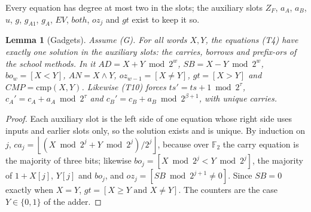 \documentclass[11pt,letterpaper]{article}
\newtheorem{lemma}[theorem]{Lemma}
\theoremstyle{definition}
\theoremstyle{remark}
\newcommand{\floor}[1]{\left\lfloor #1\right\rfloor}
\begin{document}
Every equation has degree at most two in the slots; the auxiliary slots
\(Z_F\), \(a_A\), \(a_B\), \(u\), \(g\), \(g_{A1}\), \(g_A\),
\(\mathit{EV}\), \(\mathit{both}\), \(\mathit{oz}_j\) and \(\mathit{gt}\)
exist to keep it so.

\begin{lemma}[Gadgets]\label{lem:trace-gadgets}
Assume (G). For all words \(X,Y\), the equations (T4) have exactly one
solution in the auxiliary slots: the carries, borrows and prefix-ors of
the school methods. In it \(\mathit{AD}=X+Y\bmod2^w\),
\(\mathit{SB}=X-Y\bmod2^w\), \(\mathit{bo}_w=[X<Y]\),
\(\mathit{AN}=X\wedge Y\), \(\mathit{oz}_{w-1}=[X\ne Y]\),
\(\mathit{gt}=[X>Y]\) and \(\mathit{CMP}=\mathrm{cmp}(X,Y)\). Likewise
(T10) forces \(\mathit{ts}'=\mathit{ts}+1\bmod2^\tau\),
\(c_A'=c_A+a_A\bmod2^\tau\) and \(c_B'=c_B+a_B\bmod2^{\beta+1}\), with
unique carries.
\end{lemma}
\begin{proof}
Each auxiliary slot is the left side of one equation whose right side
uses inputs and earlier slots only, so the solution exists and is
unique. By induction on \(j\),
\(\mathit{ca}_j=\floor{(X\bmod2^j+Y\bmod2^j)/2^j}\), because over
\(\mathbb F_2\) the carry equation is the majority of three bits;
likewise \(\mathit{bo}_j=[X\bmod2^j<Y\bmod2^j]\), the majority of
\(1+X[j]\), \(Y[j]\) and \(\mathit{bo}_j\), and
\(\mathit{oz}_j=[\mathit{SB}\bmod2^{j+1}\ne0]\). Since \(\mathit{SB}=0\)
exactly when \(X=Y\), \(\mathit{gt}=[X\ge Y\text{ and }X\ne Y]\). The
counters are the case \(Y\in\{0,1\}\) of the adder.
\end{proof}
\end{document}
